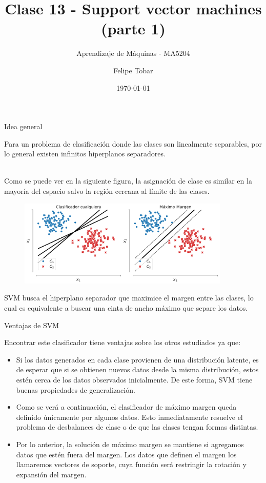 \documentclass[9pt]{beamer}
\title{Clase 13 - Support vector machines (parte 1)}
\subtitle{Aprendizaje de Máquinas - MA5204}
\date{\today}
\author{Felipe Tobar}
\institute{Department of Mathematical Engineering \&\\ Center for Mathematical Modelling\\Universidad de Chile}
\begin{document}
\begin{frame}
  \titlepage
\end{frame}

\begin{frame}{Idea general}

Para un problema de clasificación donde las clases son linealmente separables, por lo general existen infinitos hiperplanos separadores.\\~\ \pause

Como se puede ver en la siguiente figura, la asignación de clase es similar en la mayoría del espacio salvo la región cercana al límite de las clases.

\begin{figure}[ht]
    \centering
    \includegraphics[width=0.9\textwidth]{../img/cap5_max_margen.pdf}
\end{figure}\pause

SVM busca el hiperplano separador que maximice el margen entre las clases, lo cual es equivalente a buscar una cinta de ancho máximo que separe los datos.
	
\end{frame}


\begin{frame}{Ventajas de SVM}

Encontrar este clasificador tiene ventajas sobre los otros estudiados ya que:

\begin{itemize}
	\item Si los datos generados en cada clase provienen de una distribución latente, es de esperar que si se obtienen nuevos datos desde la misma distribución, estos estén cerca de los datos observados inicialmente. De este forma, SVM tiene buenas propiedades de generalización.\pause
	\item Como se verá a continuación, el clasificador de máximo margen queda definido únicamente por algunos datos. Esto inmediatamente resuelve el problema de desbalances de clase o de que las clases tengan formas distintas.\pause
	\item Por lo anterior, la solución de máximo margen se mantiene si agregamos datos que estén fuera del margen. Los datos que definen el margen los llamaremos vectores de soporte, cuya función será restringir la rotación y expansión del margen.
\end{itemize}
	
\end{frame}
\end{document}
